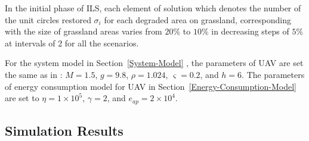 \documentclass[preprint,5pt]{elsarticle}
\begin{document}
In the initial phase of ILS, each element of solution which denotes the number of the unit circles restored $\sigma_i$ for each degraded area on grassland, corresponding with the size of grassland areas varies from $20\%$ to $10\%$ in decreasing steps of $5\%$ at intervals of 2 for all the scenarios.

For the system model in Section~\ref{System-Model} , the parameters of UAV are set the same as in \cite{dorling2016vehicle}: $M = 1.5$, $g = 9.8$, $\rho = 1.024$, $\varsigma = 0.2$, and $h = 6$. %
The parameters of energy consumption model for UAV in Section~\ref{Energy-Consumption-Model} are set to $\eta = 1 \times 10^5$, $\gamma = 2$, and $e_{ap} = 2 \times 10^4$.
\subsection{Simulation Results}
\end{document}
